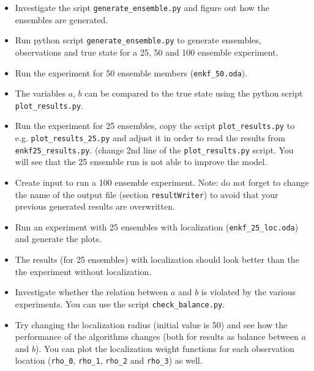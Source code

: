 \begin{itemize}
\item Investigate the sript {\tt generate\_ensemble.py} and figure out how the ensembles are generated.
\item Run python script {\tt generate\_ensemble.py} to generate ensembles, observations and true state for a 25, 50 and 100 ensemble experiment.  
\item Run the experiment for 50 ensemble members ({\tt enkf\_50.oda}).
\item The variables $a$, $b$ can be compared to the true state using the python script {\tt plot\_results.py}.
\item Run the experiment for 25 ensembles, copy the script {\tt plot\_results.py} to e.g. {\tt plot\_results\_25.py} and adjust it in order to read the results from {\tt enkf25\_results.py}.
(change 2nd line of the {\tt plot\_results.py} script. You will see that the 25 ensemble run is not able to improve the model.
\item Create input to run a 100 ensemble experiment. Note: do not forget to change the name of the output file (section {\tt resultWriter}) 
to avoid that your previous generated results are overwritten. 
\item Run an experiment with 25 ensembles with localization ({\tt enkf\_25\_loc.oda}) and generate the plots.
\item The results (for 25 ensembles) with localization should look better than the the experiment without localization.
\item Investigate whether the relation between $a$ and $b$ is violated by the various experiments. You can use the script {\tt check\_balance.py}.
\item Try changing the localization radius (initial value is 50) and see how the performance of the algorithms changes (both for results as balance between $a$ and $b$). You can plot the localization weight functions for each observation location ({\tt rho\_0}, {\tt rho\_1}, {\tt rho\_2} and {\tt rho\_3}) as well.
\end{itemize}








